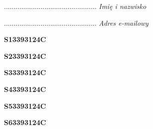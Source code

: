 \begin{turn}{90}\begin{minipage}{\linewidth} \vspace{20mm} ................................................  \textit{Imię i nazwisko}\end{minipage}\end{turn}

\begin{turn}{90}\begin{minipage}{\linewidth} \vspace{20mm} ................................................  \textit{Adres e-mailowy}\end{minipage}\end{turn}

\begin{turn}{90}\huge \begin{minipage}{\linewidth} \vspace{10mm}\textbf{S13393124C}\end{minipage}\end{turn}

\begin{turn}{90}\huge \begin{minipage}{\linewidth} \vspace{10mm}\textbf{S23393124C}\end{minipage}\end{turn}

\begin{turn}{90}\huge \begin{minipage}{\linewidth} \vspace{10mm}\textbf{S33393124C}\end{minipage}\end{turn}

\begin{turn}{90}\huge \begin{minipage}{\linewidth} \vspace{10mm}\textbf{S43393124C}\end{minipage}\end{turn}

\begin{turn}{90}\huge \begin{minipage}{\linewidth} \vspace{10mm}\textbf{S53393124C}\end{minipage}\end{turn}

\begin{turn}{90}\huge \begin{minipage}{\linewidth} \vspace{10mm}\textbf{S63393124C}\end{minipage}\end{turn}

